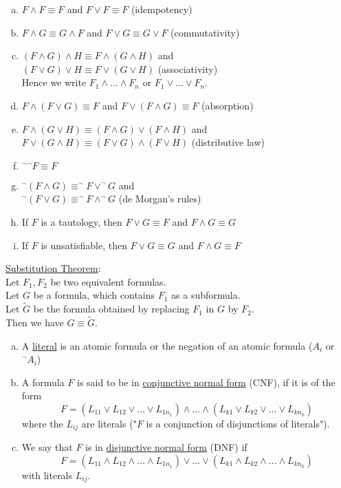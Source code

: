 \documentclass[a4paper]{article}
\newcommand{\ul}{\underline}
\begin{document}
\begin{enumerate}[(a)]
	\item $F\wedge F\equiv F$ and $F\vee F\equiv F$ (idempotency)
	\item $F\wedge G\equiv G\wedge F$ and $F\vee G\equiv G\vee F$ (commutativity)
	\item $(F\wedge G)\wedge H\equiv F\wedge(G\wedge H)$ and\\
	$(F\vee G)\vee H\equiv F\vee (G\vee H)$ (associativity)\\
	Hence we write $F_1\wedge\dots\wedge F_n$ or $F_1\vee \dots\vee F_n$.
	\item $F\wedge(F\vee G)\equiv F$ and $F\vee(F\wedge G)\equiv F$ (absorption)
	\item $F\wedge(G\vee H)\equiv (F\wedge G)\vee(F\wedge H)$ and\\
	$F\vee(G\wedge H)\equiv (F\vee G)\wedge(F\vee H)$ (distributive law)
	\item $^\neg$$^\neg F\equiv F$
	\item $^\neg(F\wedge G)\equiv ^\neg F\vee ^\neg G$ and\\
	$^\neg(F\vee G)\equiv ^\neg F\wedge ^\neg G$ (de Morgan's rules)
	\item If $F$ is a tautology, then $F\vee G\equiv F$ and $F\wedge G\equiv G$
	\item If $F$ is unsatisfiable, then $F\vee G\equiv G$ and $F\wedge G\equiv F$
\end{enumerate}
\ul{Substitution Theorem}:\\
Let $F_1,F_2$ be two equivalent formulas.\\
Let $G$ be a formula, which contains $F_1$ as a subformula.\\
Let $\tilde{G}$ be the formula obtained by replacing $F_1$ in $G$ by $F_2$.\\
Then we have $G\equiv \tilde{G}$.
\begin{enumerate}[(a)]
	\item A \ul{literal} is an atomic formula or the negation of an atomic formula ($A_i$ or $^\neg A_i$)
	\item A formula $F$ is said to be in \ul{conjunctive normal form} (CNF), if it is of the form $$F=(L_{11}\vee L_{12}\vee\dots\vee L_{1n_1})\wedge\dots\wedge(L_{k1}\vee L_{k2}\vee\dots\vee L_{kn_k})$$ where the $L_{ij}$ are literals ("$F$ is a conjunction of disjunctions of literals").
	\item We say that $F$ is in \ul{disjunctive normal form} (DNF) if $$F=(L_{11}\wedge L_{12}\wedge\dots\wedge L_{1n_1})\vee\dots\vee(L_{k1}\wedge L_{k2}\wedge\dots\wedge L_{kn_k})$$ with literals $L_{ij}$.
\end{enumerate}
\end{document}
